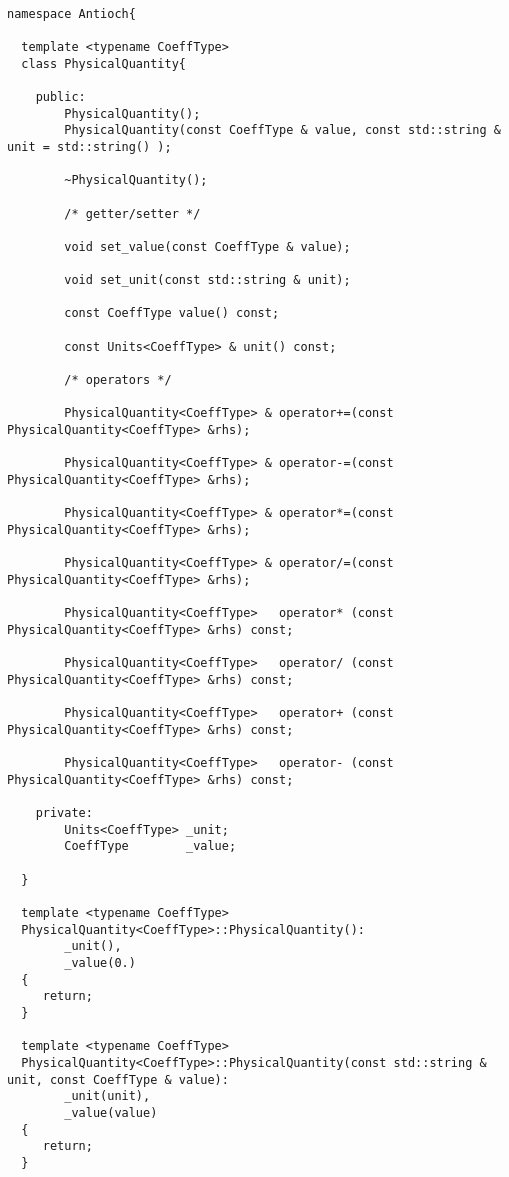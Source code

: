 \begin{verbatim}

namespace Antioch{

  template <typename CoeffType>
  class PhysicalQuantity{

    public:
        PhysicalQuantity();
        PhysicalQuantity(const CoeffType & value, const std::string & unit = std::string() );

        ~PhysicalQuantity();

        /* getter/setter */

        void set_value(const CoeffType & value);

        void set_unit(const std::string & unit);

        const CoeffType value() const;

        const Units<CoeffType> & unit() const;

        /* operators */

        PhysicalQuantity<CoeffType> & operator+=(const PhysicalQuantity<CoeffType> &rhs);

        PhysicalQuantity<CoeffType> & operator-=(const PhysicalQuantity<CoeffType> &rhs);

        PhysicalQuantity<CoeffType> & operator*=(const PhysicalQuantity<CoeffType> &rhs);

        PhysicalQuantity<CoeffType> & operator/=(const PhysicalQuantity<CoeffType> &rhs);

        PhysicalQuantity<CoeffType>   operator* (const PhysicalQuantity<CoeffType> &rhs) const;

        PhysicalQuantity<CoeffType>   operator/ (const PhysicalQuantity<CoeffType> &rhs) const;

        PhysicalQuantity<CoeffType>   operator+ (const PhysicalQuantity<CoeffType> &rhs) const;

        PhysicalQuantity<CoeffType>   operator- (const PhysicalQuantity<CoeffType> &rhs) const;

    private:
        Units<CoeffType> _unit;
        CoeffType        _value;

  }

  template <typename CoeffType>
  PhysicalQuantity<CoeffType>::PhysicalQuantity():
        _unit(),
        _value(0.)
  {
     return;
  }

  template <typename CoeffType>
  PhysicalQuantity<CoeffType>::PhysicalQuantity(const std::string & unit, const CoeffType & value):
        _unit(unit),
        _value(value)
  {
     return;
  }


\end{verbatim}
